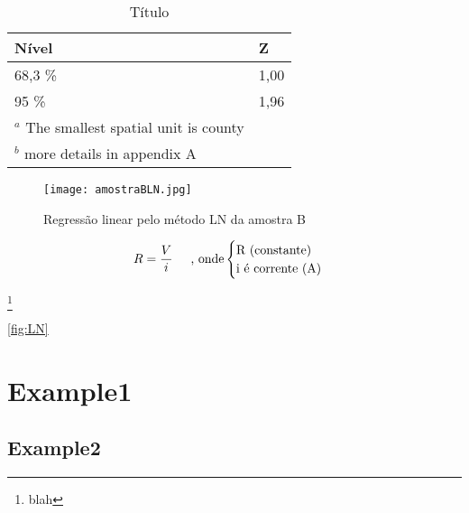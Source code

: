 

\begin{table}[H]
	\centering
	\caption{Título}
	\label{tab:example}
	\begin{tabular}{l l}
		\hline
		    Nível & Z \\ 
		\hline
		68,3 \%      &   1,00\\
		95 \%        &   1,96\\
		\hline
		\footnotesize{$^a$ The smallest spatial unit is county} \\
		\footnotesize{ $^b$ more details in appendix A}\\
	\end{tabular}
\end{table}



\begin{figure}[H]
    \centering
    \caption {Regressão linear pelo método LN da amostra B}
    \texttt{[image: amostraBLN.jpg]}
    \label{fig:example}
\end{figure}


\begin{equation}
     R = \frac{V}{i} 
     \textrm{\hspace{0.5cm}, onde}
    \begin{cases}
        \text{R (constante)} \\
        \text{i é corrente (A)}
    \end{cases}
    \label{eq:leiohm}   
\end{equation}


\usepackage[version=4]{mhchem}




\footnote{blah}




\ref{fig:LN}



\cite{Cataluna2012}



\section{Example1}
\subsection{Example2}
